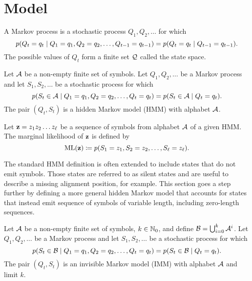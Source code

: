\section{Model}

\begin{definition}\label{def:mp}
  A Markov process is a stochastic process $Q_1, Q_2, \dots$ for which
  \begin{equation*}
    p(Q_t=q_t \;|\; Q_1=q_1, Q_2=q_2, \dots, Q_{t-1}=q_{t-1}) = p(Q_t=q_t \;|\; Q_{t-1}=q_{t-1}).
  \end{equation*}
  The possible values of $Q_t$ form a finite set $\mathcal{Q}$ called the state space.
\end{definition}

\begin{definition}\label{def:hmm}
  Let $\mathcal{A}$ be a non-empty finite set of symbols. Let $Q_1, Q_2, \dots$ be a Markov process and
  let $S_1, S_2, \dots$ be a stochastic process for which
  \begin{equation*}
    p(S_t\in\mathcal{A} \;|\; Q_1=q_1, Q_2=q_2, \dots, Q_t=q_t) = p(S_t\in\mathcal{A} \;|\; Q_t=q_t).
  \end{equation*}
  The pair $(Q_t, S_t)$ is a hidden Markov model (HMM) with alphabet $\mathcal{A}$.
\end{definition}

Let $\mathbf{z}=z_1z_2 \dots z_\ell$ be a sequence of symbols from alphabet $\mathcal{A}$ of a given HMM.\@
The marginal likelihood of $\mathbf{z}$ is defined by
\begin{equation}\label{eq:hml}
  \mathrm{ML}(\mathbf{z}) \coloneqq p(S_1=z_1, S_2=z_2, \dots, S_\ell=z_\ell).
\end{equation}

The standard HMM definition is often extended to include states that do not emit symbols. Those
states are referred to as silent states and are useful to describe a missing alignment position, for
example. This section goes a step further by defining a more general hidden Markov model that
accounts for states that instead emit sequence of symbols of variable length, including zero-length
sequences.

\begin{definition}
  Let $\mathcal{A}$ be a non-empty finite set of symbols, $k\in\mathbb{N}_0$, and define
  $\mathcal{B}=\bigcup_{i=0}^k\mathcal{A}^i$.
  Let $Q_1, Q_2, \dots$ be a Markov process and let $S_1, S_2, \dots$ be a stochastic process for
  which
  \begin{equation*}
    p(S_t\in\mathcal{B} \;|\; Q_1=q_1, Q_2=q_2, \dots, Q_t=q_t)
    = p(S_t\in\mathcal{B} \;|\; Q_t=q_t).
  \end{equation*}
  The pair $(Q_t, S_t)$ is an invisible Markov model (IMM) with alphabet $\mathcal{A}$ and
  limit $k$.
\end{definition}

